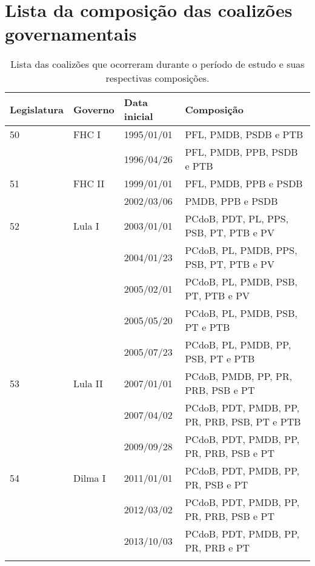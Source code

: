 \chapter{Lista da composição das coalizões governamentais}
\label{apendice:composicao-coalizoes}

\begin{longtable}{l l l l}
\centering
  Legislatura & Governo & Data inicial & Composição \\
  \hline
  50\textordfeminine{} & FHC I & 1995/01/01 & PFL, PMDB, PSDB e PTB \\
  & & 1996/04/26 & PFL, PMDB, PPB, PSDB e PTB \\
  51\textordfeminine{} & FHC II & 1999/01/01 & PFL, PMDB, PPB e PSDB \\
  & & 2002/03/06 & PMDB, PPB e PSDB \\
  52\textordfeminine{} & Lula I & 2003/01/01 & PCdoB, PDT, PL, PPS, PSB, PT, PTB e PV \\
  & & 2004/01/23 & PCdoB, PL, PMDB, PPS, PSB, PT, PTB e PV \\
  & & 2005/02/01 & PCdoB, PL, PMDB, PSB, PT, PTB e PV \\
  & & 2005/05/20 & PCdoB, PL, PMDB, PSB, PT e PTB \\
  & & 2005/07/23 & PCdoB, PL, PMDB, PP, PSB, PT e PTB \\
  53\textordfeminine{} & Lula II & 2007/01/01 & PCdoB, PMDB, PP, PR, PRB, PSB e PT \\
  & & 2007/04/02 & PCdoB, PDT, PMDB, PP, PR, PRB, PSB, PT e PTB \\
  & & 2009/09/28 & PCdoB, PDT, PMDB, PP, PR, PRB, PSB e PT \\
  54\textordfeminine{} & Dilma I & 2011/01/01 & PCdoB, PDT, PMDB, PP, PR, PSB e PT \\
  & & 2012/03/02 & PCdoB, PDT, PMDB, PP, PR, PRB, PSB e PT \\
  & & 2013/10/03 & PCdoB, PDT, PMDB, PP, PR, PRB e PT \\
\caption{Lista das coalizões que ocorreram durante o período de estudo e suas respectivas composições.}
\end{longtable}
